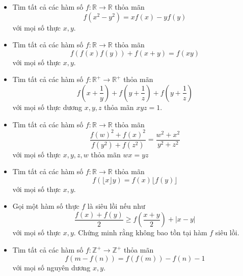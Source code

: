 \documentclass[11pt]{scrartcl}
\begin{document}
\begin{itemize}[label=, leftmargin=0em, itemsep=-0em]
    \item \begin{btvn}
        Tìm tất cả các hàm số $f: \mathbb{R} \to \mathbb{R}$ thỏa mãn
        \[
           f(x^2 - y^2) = xf(x) - yf(y)
        \]
        với mọi số thực $x,y$.
    \end{btvn}
    \item \begin{btvn}
        Tìm tất cả các hàm số $f: \mathbb{R} \to \mathbb{R}$ thỏa mãn
        \[
           f(f(x)f(y)) + f(x + y) = f(xy)
        \]
        với mọi số thực $x,y$.
    \end{btvn}
    \item \begin{btvn}
        Tìm tất cả các hàm số $f: \mathbb{R}^+ \to \mathbb{R}^+$ thỏa mãn
        \[
           f\left(x + \frac{1}{y}\right) + f\left(y + \frac{1}{z}\right) + f\left(y + \frac{1}{z}\right)
        \]
        với mọi số thực dương $x,y,z$ thỏa mãn $xyz = 1$.
    \end{btvn}
    \item \begin{btvn}
        Tìm tất cả các hàm số $f: \mathbb{R} \to \mathbb{R}$ thỏa mãn
        \[
           \frac{f(w)^2 + f(x)^2}{f(y^2) + f(z^2)} = \frac{w^2 + x^2}{y^2 + z^2}
        \]
        với mọi số thực $x,y,z,w$ thỏa mãn $wx = yz$
    \end{btvn}
    \item \begin{btvn}
        Tìm tất cả các hàm số $f: \mathbb{R} \to \mathbb{R}$ thỏa mãn
        \[
            f(\lfloor x\rfloor y) = f(x)\lfloor f(y)\rfloor
        \]
        với mọi số thực $x,y$.
    \end{btvn}
    \item \begin{btvn}
        Gọi một hàm số thực $f$ là siêu lồi nếu như 
        \[
            \frac{f(x) + f(y)}{2} \geq f\left(\frac{x +y}{2}\right) + |x - y|
        \]
        với mọi số thực $x,y$. Chứng minh rằng không bao tồn tại hàm $f$ siêu lồi.
    \end{btvn}
    \item \begin{btvn}
        Tìm tất cả các hàm số $f: \mathbb{Z}^+ \to \mathbb{Z}^+$ thỏa mãn
        \[
           f(m - f(n))  = f(f(m)) - f(n) -1
        \]
        với mọi số nguyên dương $x,y$.

\end{btvn}
\end{itemize}
\end{document}
